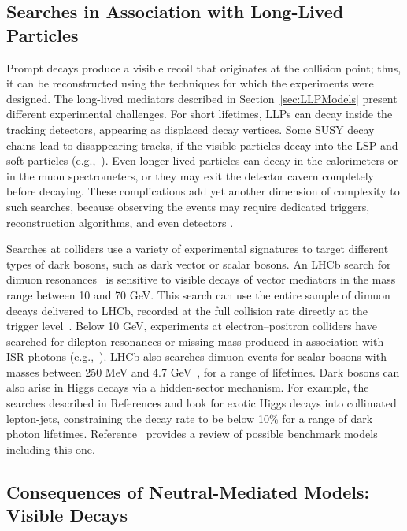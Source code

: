 \documentclass{ar-1col}
\begin{document}
\subsection{Searches in Association with Long-Lived Particles}\label{sec:results_LLPSearches}

Prompt decays produce a visible recoil that originates at the collision
point; thus, it can be reconstructed using the techniques for
which the experiments were designed. The long-lived mediators
described in Section~\ref{sec:LLPModels} present different
experimental challenges. For short lifetimes, LLPs can decay inside the tracking detectors, appearing as
displaced decay vertices. Some SUSY decay chains lead to
disappearing tracks, if the visible particles decay into the LSP
and soft particles (e.g.,~).
Even longer-lived particles can decay in the calorimeters or in
the muon spectrometers, or they may exit the detector cavern
completely before decaying. These complications add yet another
dimension of complexity to such searches, because observing the
events may require dedicated triggers, reconstruction algorithms,
and even detectors \cite{Ball:2016zrp,Chou:2016lxi}.

Searches at colliders use a variety of experimental signatures to
target different types of dark bosons, such as dark vector or
scalar bosons. An LHCb search for dimuon
resonances~\cite{Aaij:2017rft} is sensitive to visible decays of
vector mediators in the mass range between 10 and 70 GeV. This
search can use the entire sample of dimuon decays delivered to
LHCb, recorded at the full collision rate directly at the trigger
level~\cite{Aaij:2016rxn}. Below 10 GeV, experiments at
electron--positron colliders have searched for dilepton resonances
or missing mass produced in association with ISR photons (e.g.,~). LHCb also searches dimuon
events for scalar bosons with masses between 250 MeV and 4.7
GeV~\cite{Aaij:2016qsm}, for a range of lifetimes. Dark bosons can
also arise in Higgs decays via a hidden-sector mechanism. For
example, the searches described in References  and 
look for exotic Higgs decays into collimated lepton-jets,
constraining the decay rate to be below 10\% for a range of dark
photon lifetimes. Reference~ provides a review of
possible benchmark models including this one.

\subsection{Consequences of Neutral-Mediated Models: Visible Decays}\label{sec:MediatorSearches} \label{sub:twoBody}
\end{document}
